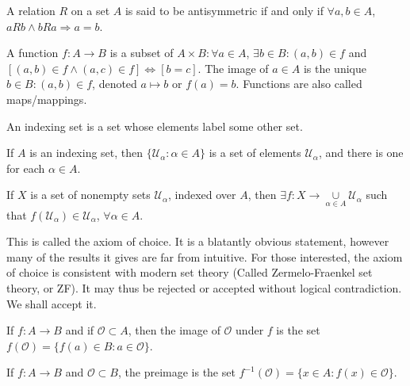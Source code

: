 \documentclass[crop=false,class=article,oneside]{standalone}
\begin{document}
        \begin{definition}
        A relation $R$ on a set $A$ is said to be antisymmetric if and only if $\forall a,b \in A$, $aRb\land bRa\Rightarrow a=b$.
        \end{definition}
        \begin{definition}
        A function $f:A\rightarrow B$ is a subset of $A\times B: \forall a\in A$, $\exists b\in B: (a,b)\in f$ and $[(a,b)\in f\land (a,c)\in f]\Leftrightarrow [b=c]$. The image of $a\in A$ is the unique $b\in B:(a,b)\in f$, denoted $a\mapsto b$ or $f(a)=b$. Functions are also called maps/mappings.
        \end{definition}
        \begin{definition}
        An indexing set is a set whose elements label some other set.
        \end{definition}
        \begin{example}
        If $A$ is an indexing set, then $\{\mathcal{U}_{\alpha}:\alpha \in A\}$ is a set of elements $\mathcal{U}_{\alpha}$, and there is one for each $\alpha \in A$.
        \end{example}
        \begin{axiom}
        If $X$ is a set of nonempty sets $\mathcal{U}_{\alpha}$, indexed over $A$, then $\exists f:X\rightarrow \underset{\alpha \in A}\cup \mathcal{U}_{\alpha}$ such that $f(\mathcal{U}_{\alpha}) \in \mathcal{U}_{\alpha}$, $\forall \alpha\in A$.
        \end{axiom}
        \begin{remark}
        This is called the axiom of choice. It is a blatantly obvious statement, however many of the results it gives are far from intuitive. For those interested, the axiom of choice is consistent with modern set theory (Called Zermelo-Fraenkel set theory, or ZF). It may thus be rejected or accepted without logical contradiction. We shall accept it.
        \end{remark}
        \begin{definition}
        If $f:A\rightarrow B$ and if $\mathcal{O}\subset A$, then the image of $\mathcal{O}$ under $f$ is the set $f(\mathcal{O}) = \{f(a)\in B:a\in \mathcal{O}\}$.
        \end{definition}
        \begin{definition}
        If $f:A\rightarrow B$ and $\mathscr{O}\subset B$, the preimage is the set $f^{-1}(\mathscr{O}) = \{x\in A:f(x)\in \mathscr{O}\}$.
        \end{definition}
\end{document}
